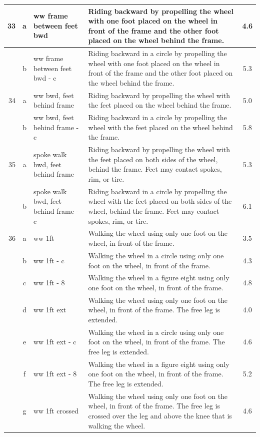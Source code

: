 \begin{longtable}{|r|c|p{4cm}|p{8cm}|c|}
\hline
33  & a & ww frame between feet bwd & Riding backward by propelling the wheel with one foot placed on the wheel in front of the frame and the other foot placed on the wheel behind the frame.  & 4.6 \\ 
\hline
  & b & ww frame between feet bwd - c & Riding backward in a circle by propelling the wheel with one foot placed on the wheel in front of the frame and the other foot placed on the wheel behind the frame.  & 5.3 \\ 
\hline
34  & a & ww bwd, feet behind frame & Riding backward by propelling the wheel with the feet placed on the wheel behind the frame. & 5.0 \\ 
\hline
  & b & ww bwd, feet behind frame - c & Riding backward in a circle by propelling the wheel with the feet placed on the wheel behind the frame. & 5.8 \\ 
\hline
35  & a & spoke walk bwd, feet behind frame & Riding backward by propelling the wheel with the feet placed on both sides of the wheel, behind the frame. Feet may contact spokes, rim, or tire. & 5.3 \\ 
\hline
  & b & spoke walk bwd, feet behind frame - c & Riding backward in a circle by propelling the wheel with the feet placed on both sides of the wheel, behind the frame. Feet may contact spokes, rim, or tire. & 6.1 \\ 
\hline
36  & a & ww 1ft  & Walking the wheel using only one foot on the wheel, in front of the frame.  & 3.5 \\ 
\hline
  & b & ww 1ft - c  & Walking the wheel in a circle using only one foot on the wheel, in front of the frame.  & 4.3 \\ 
\hline
  & c & ww 1ft - 8  & Walking the wheel in a figure eight using only one foot on the wheel, in front of the frame.  & 4.8 \\ 
\hline
  & d & ww 1ft ext  & Walking the wheel using only one foot on the wheel, in front of the frame. The free leg is extended.  & 4.0 \\ 
\hline
  & e & ww 1ft ext - c  & Walking the wheel in a circle using only one foot on the wheel, in front of the frame. The free leg is extended.  & 4.6 \\ 
\hline
  & f & ww 1ft ext - 8  & Walking the wheel in a figure eight using only one foot on the wheel, in front of the frame. The free leg is extended.  & 5.2 \\ 
\hline
  & g & ww 1ft crossed  & Walking the wheel using only one foot on the wheel, in front of the frame. The free leg is crossed over the leg and above the knee that is walking the wheel. & 4.6 \\ 

\end{longtable}
